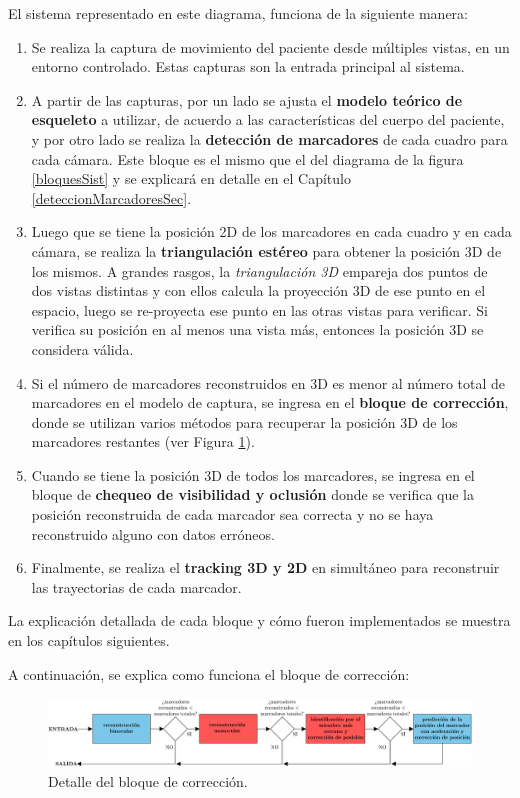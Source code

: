 El sistema representado en este diagrama, funciona de la siguiente manera:

\begin{enumerate}
\item Se realiza la captura de movimiento del paciente desde múltiples vistas, en un entorno controlado. Estas capturas son la entrada principal al sistema.
\item A partir de las capturas, por un lado se ajusta el \textbf{modelo teórico de esqueleto} a utilizar, de acuerdo a las características del cuerpo del paciente, y por otro lado se realiza la \textbf{detección de marcadores} de cada cuadro para cada cámara. Este bloque es el mismo que el del diagrama de la figura \ref{bloquesSist} y se explicará en detalle en el Capítulo \ref{deteccionMarcadoresSec}.
\item Luego que se tiene la posición 2D de los marcadores en cada cuadro y en cada cámara, se realiza la \textbf{triangulación estéreo} para obtener la posición 3D de los mismos. A grandes rasgos, la \emph{triangulación 3D} empareja dos puntos de dos vistas distintas y con ellos calcula la proyección 3D de ese punto en el espacio, luego se re-proyecta ese punto en las otras vistas para verificar. Si verifica su posición en al menos una vista más, entonces la posición 3D se considera válida.
\item Si el número de marcadores reconstruidos en 3D es menor al número total de marcadores en el modelo de captura, se ingresa en el \textbf{bloque de corrección}, donde se utilizan varios métodos para recuperar la posición 3D de los marcadores restantes (ver Figura \ref{fig:bloqCorr}). 
\item Cuando se tiene la posición 3D de todos los marcadores, se ingresa en el bloque de \textbf{chequeo de visibilidad y oclusión} donde se verifica que la posición reconstruida de cada marcador sea correcta y no se haya reconstruido alguno con datos erróneos.
\item Finalmente, se realiza el \textbf{tracking 3D y 2D} en simultáneo para reconstruir las trayectorias de cada marcador.
\end{enumerate}

La explicación detallada de cada bloque y cómo fueron implementados se muestra en los capítulos siguientes.

A continuación, se explica como funciona el bloque de corrección:

\begin{figure}[H]
\hspace{-1cm}
\includegraphics[scale=0.22]{img/Sistema_completo/BloquesDeCorreccion}
\caption{Detalle del bloque de corrección.}
\label{fig:bloqCorr}
\end{figure}

